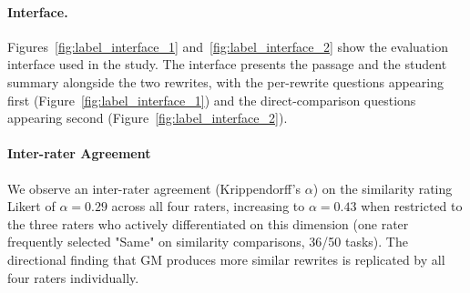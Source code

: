 \documentclass[letterpaper]{article} %
\begin{document}
\paragraph{Interface.} Figures~\ref{fig:label_interface_1} and~\ref{fig:label_interface_2} show the evaluation interface used in the study. The interface presents the passage and the student summary alongside the two rewrites, with the per-rewrite questions appearing first (Figure~\ref{fig:label_interface_1}) and the direct-comparison questions appearing second (Figure~\ref{fig:label_interface_2}).

\paragraph{Inter-rater Agreement} We observe an inter-rater agreement (Krippendorff's $\alpha$) on the similarity rating Likert of $\alpha=0.29$ across all four raters, increasing to $\alpha=0.43$ when restricted to the three raters who actively differentiated on this dimension (one rater frequently selected "Same" on similarity comparisons, 36/50 tasks). The directional finding that GM produces more similar rewrites is replicated by all four raters individually.


\end{document}
